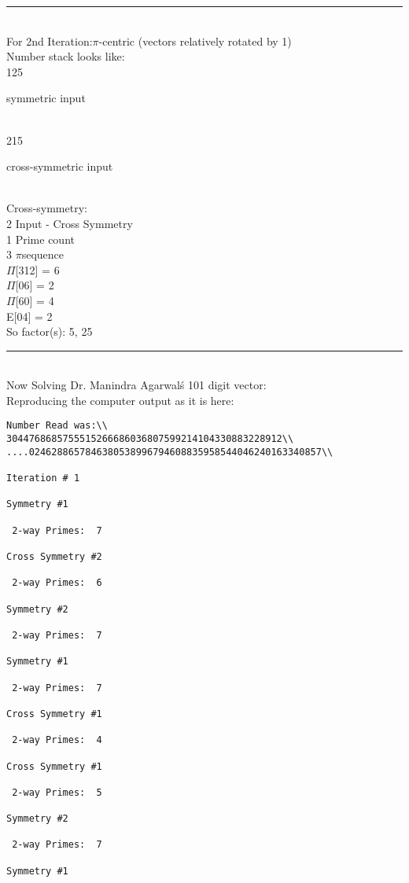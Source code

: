 \noindent\rule{8cm}{0.4pt}
\\
For 2nd Iteration:$\pi$-centric (vectors relatively rotated by 1) \\
Number stack looks like:\\
125 {symmetric input{\\
215 {cross-symmetric input{\\

Cross-symmetry:\\ 
2  {Input - Cross Symmetry}\\
1  {Prime count}\\
3  {$\pi$\-sequence}\\

$\Pi$[312] = 6\\
$\Pi$[06] = 2\\
$\Pi$[60] = 4\\
E[04] = 2\\

So factor(s): 5, 25\\

\noindent\rule{8cm}{0.4pt}
\\
Now Solving Dr. Manindra Agarwal\'s 101 digit vector:\\
Reproducing the computer output as it is here:\\

\begin{verbatim}
Number Read was:\\
3044768685755515266686036807599214104330883228912\\
....0246288657846380538996794608835958544046240163340857\\

Iteration #	1

Symmetry #1

 2-way Primes: 	7

Cross Symmetry #2

 2-way Primes: 	6

Symmetry #2

 2-way Primes: 	7

Symmetry #1

 2-way Primes: 	7

Cross Symmetry #1

 2-way Primes: 	4

Cross Symmetry #1

 2-way Primes: 	5

Symmetry #2

 2-way Primes: 	7

Symmetry #1


\end{verbatim}}}}}
